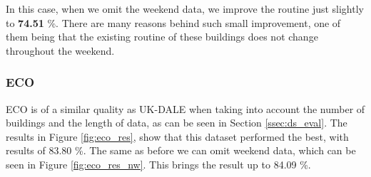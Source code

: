In this case, when we omit the weekend data, we improve the routine just slightly to \textbf{74.51} \%.
There are many reasons behind such small improvement, one of them being that the existing routine of these buildings does not change throughout the weekend. 

\subsubsection{ECO}

ECO is of a similar quality as UK-DALE when taking into account the number of buildings and the length of data, as can be seen in Section \ref{ssec:ds_eval}.
The results in Figure \ref{fig:eco_res}, show that this dataset performed the best, with results of 83.80 \%.
The same as before we can omit weekend data, which can be seen in Figure \ref{fig:eco_res_nw}. This brings the result up to 84.09 \%. 

